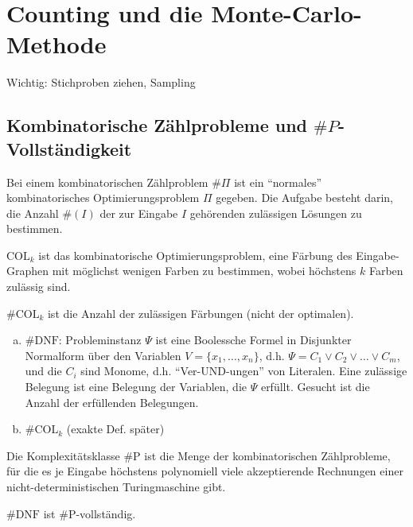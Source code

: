 \section{Counting und die Monte-Carlo-Methode}
Wichtig: Stichproben ziehen, Sampling
\subsection{Kombinatorische Zählprobleme und $\#P$-Vollständigkeit}
\begin{defn}
	Bei einem kombinatorischen Zählproblem $\#\Pi$ ist ein "`normales"'
	kombinatorisches Optimierungsproblem $\Pi$ gegeben. Die Aufgabe besteht
	darin, die Anzahl $\#(I)$ der zur Eingabe $I$ gehörenden zulässigen
	Lösungen zu bestimmen.
\end{defn}
\begin{exmp}
	$\text{COL}_k$ ist das kombinatorische Optimierungsproblem, eine
	Färbung des Eingabe-Graphen mit möglichst wenigen Farben zu bestimmen,
	wobei höchstens $k$ Farben zulässig sind.

	$\#\text{COL}_k$ ist die Anzahl der zulässigen Färbungen (nicht der optimalen).
\end{exmp}
\begin{defn}
	\begin{enumerate}[(a)]
		\item	$\#\text{DNF}$: Probleminstanz $\Psi$ ist eine
			Boolessche Formel in Disjunkter Normalform über den
			Variablen $V = \{x_1, \dots, x_n\}$, d.h. $\Psi = C_1
			\vee C_2 \vee \dots \vee C_m$, und die $C_i$ sind
			Monome, d.h. "`Ver-UND-ungen"' von Literalen. Eine
			zulässige Belegung ist eine Belegung der Variablen, die
			$\Psi$ erfüllt. Gesucht ist die Anzahl der erfüllenden
			Belegungen.
		\item	$\#\text{COL}_k$ (exakte Def. später)
	\end{enumerate}
\end{defn}
\begin{defn}
	Die Komplexitätsklasse $\#\text{P}$ ist die Menge der kombinatorischen
	Zählprobleme, für die es je Eingabe höchstens polynomiell viele
	akzeptierende Rechnungen einer nicht-de\-ter\-mi\-nis\-tischen
	Turingmaschine gibt.
\end{defn}
$\#\text{DNF}$ ist $\#\text{P}$-vollständig.
